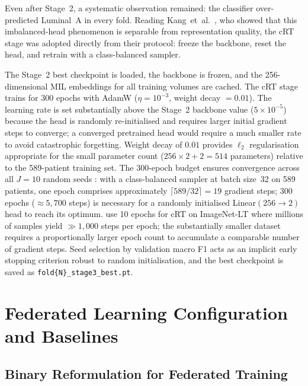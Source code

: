 Even after Stage~2, a systematic observation remained:
the classifier over-predicted Luminal~A in every fold.
Reading Kang~et~al.\ \cite{kang2020decoupling}, who showed
that this imbalanced-head phenomenon is separable from
representation quality, the cRT stage was adopted directly
from their protocol: freeze the backbone, reset the head,
and retrain with a class-balanced sampler.

The Stage~2 best checkpoint is loaded, the backbone is frozen,
and the 256-dimensional MIL embeddings for all training
volumes are cached.
The cRT stage trains for 300 epochs with
AdamW ($\eta = 10^{-3}$, weight decay $= 0.01$).
The learning rate is set substantially above the
Stage~2 backbone value ($5 \times 10^{-5}$) because
the head is randomly re-initialised and requires larger
initial gradient steps to converge; a converged
pretrained head would require a much smaller rate to
avoid catastrophic forgetting.
Weight decay of $0.01$ provides $\ell_2$ regularisation
appropriate for the small parameter count
($256 \times 2 + 2 = 514$ parameters) relative to the
589-patient training set.
The 300-epoch budget ensures convergence across all
$J = 10$ random seeds \cite{kang2020decoupling}:
with a class-balanced sampler at batch size~32 on
589 patients, one epoch comprises approximately
$\lceil 589/32 \rceil = 19$ gradient steps;
300 epochs (${\approx}5{,}700$ steps) is necessary
for a randomly initialised Linear$(256 \to 2)$ head
to reach its optimum.
\textcite{kang2020decoupling} use 10 epochs for cRT on
ImageNet-LT where millions of samples yield
${\gg}1{,}000$ steps per epoch; the substantially
smaller dataset requires a proportionally larger epoch
count to accumulate a comparable number of gradient
steps.
Seed selection by validation macro F1 acts as an
implicit early stopping criterion robust to random
initialisation, and the best checkpoint is saved as
\texttt{fold\{N\}\_stage3\_best.pt}.


\section{Federated Learning Configuration and Baselines}
\label{sec:fl-setup}

\subsection{Binary Reformulation for Federated Training}
\label{sec:binary-task}

